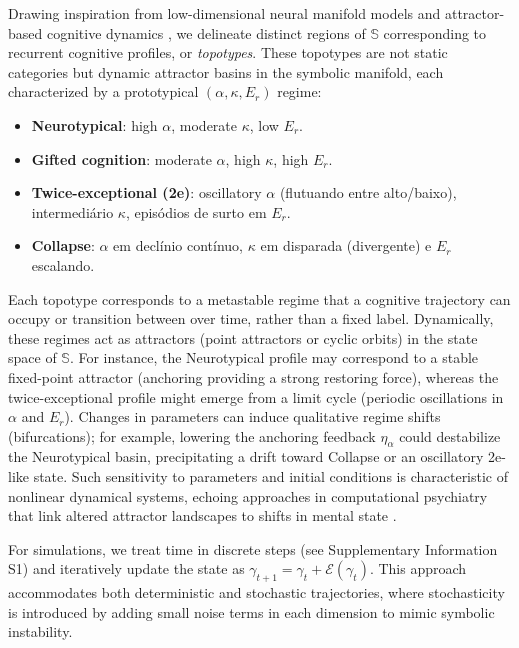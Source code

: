 Drawing inspiration from low-dimensional neural manifold models \cite{langdon2023, sizemore2019, rouse2023} and attractor-based cognitive dynamics \cite{helmich2021, rolls2021}, we delineate distinct regions of $\mathbb{S}$ corresponding to recurrent cognitive profiles, or \textit{topotypes}. These topotypes are not static categories but dynamic attractor basins in the symbolic manifold, each characterized by a prototypical $(\alpha, \kappa, E_r)$ regime:
\begin{itemize}
    \item \textbf{Neurotypical}: high $\alpha$, moderate $\kappa$, low $E_r$.
    \item \textbf{Gifted cognition}: moderate $\alpha$, high $\kappa$, high $E_r$.
    \item \textbf{Twice-exceptional (2e)}: oscillatory $\alpha$ (flutuando entre alto/baixo), intermediário $\kappa$, episódios de surto em $E_r$.
    \item \textbf{Collapse}: $\alpha$ em declínio contínuo, $\kappa$ em disparada (divergente) e $E_r$ escalando.
\end{itemize}

Each topotype corresponds to a metastable regime that a cognitive trajectory can occupy or transition between over time, rather than a fixed label. Dynamically, these regimes act as attractors (point attractors or cyclic orbits) in the state space of $\mathbb{S}$. For instance, the Neurotypical profile may correspond to a stable fixed-point attractor (anchoring providing a strong restoring force), whereas the twice-exceptional profile might emerge from a limit cycle (periodic oscillations in $\alpha$ and $E_r$). Changes in parameters can induce qualitative regime shifts (bifurcations); for example, lowering the anchoring feedback $\eta_\alpha$ could destabilize the Neurotypical basin, precipitating a drift toward Collapse or an oscillatory 2e-like state. Such sensitivity to parameters and initial conditions is characteristic of nonlinear dynamical systems, echoing approaches in computational psychiatry that link altered attractor landscapes to shifts in mental state \cite{vandeleemput2014, gauld2023}. %

For simulations, we treat time in discrete steps (see Supplementary Information S1) and iteratively update the state as $\gamma_{t+1} = \gamma_t + \mathcal{E}(\gamma_t)$. This approach accommodates both deterministic and stochastic trajectories, where stochasticity is introduced by adding small noise terms in each dimension to mimic symbolic instability. 

